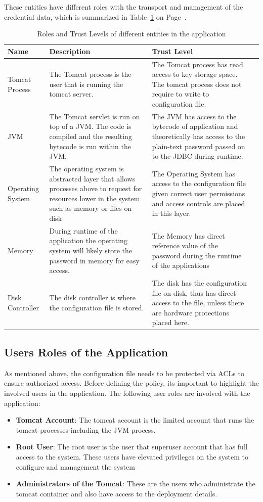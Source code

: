 \documentclass[11pt, a4paper, notitlepage]{article}
\begin{document}
These entities have different roles with the transport and management of the credential data, which is summarized in Table~\ref{trust-level} on Page~\pageref{trust-level}. 

\begin{table}[H]
\begin{tabularx}{\textwidth}{|X|X|X|X|}
\hline
\textbf{Name} & \textbf{Description} & \textbf{Trust Level} \\ \hline
Tomcat Process   & The Tomcat process is the user that is running the tomcat server. & The Tomcat process has read access to key storage space. The tomcat process does not require to write to configuration file. \\ \hline
JVM  & The Tomcat servlet is run on top of a JVM. The code is compiled and the resulting bytecode is run within the JVM.  & The JVM has access to the bytecode of application and theoretically has access to the plain-text password passed on to the JDBC during runtime. \\ \hline
Operating System & The operating system is abstracted layer that allows processes above to request for resources lower in the system such as memory or files on disk & The Operating System has access to the configuration file given correct user permissions and access controls are placed in this layer.  \\ \hline
Memory  & During runtime of the application the operating system will likely store the password in memory for easy access. & The Memory has direct reference value of the password during the runtime of the applications   \\ \hline
Disk Controller  & The disk controller is where the configuration file is stored.    & The disk has the configuration file on disk, thus has direct access to the file, unless there are hardware protections placed here. \\ \hline
\end{tabularx}
\caption{Roles and Trust Levels of different entities in the application}
\label{trust-level}
\end{table}

\subsection*{Users Roles of the Application}
As mentioned above, the configuration file needs to be protected via ACLs to ensure authorized access. Before defining the policy, its important to highlight the involved users in the application. The following user roles are involved with the application:
\begin{itemize}
\item \textbf{Tomcat Account}: The tomcat account is the limited account that runs the tomcat processes including the JVM process. 
\item \textbf{Root User}: The root user is the user that superuser account that has full access to the system. These users have elevated privileges on the system to configure and management the system
\item \textbf{Administrators of the Tomcat}: These are the users who administrate the tomcat container and also have access to the deployment details.
\end{itemize}
\end{document}
